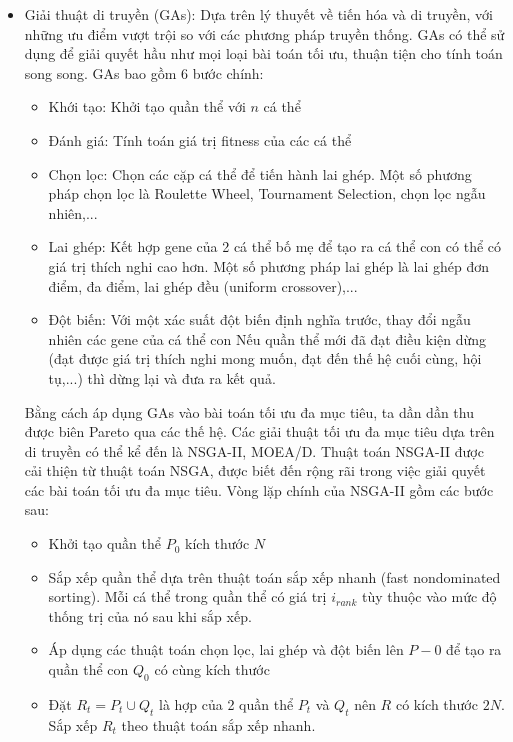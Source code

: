 \documentclass{article}
\begin{document}
\begin{itemize}
    \item Giải thuật di truyền (\gls{GAs}): Dựa trên lý thuyết về tiến hóa và di truyền, với những ưu điểm vượt trội so với các phương pháp truyền thống. GAs có thể sử dụng để giải quyết hầu như mọi loại bài toán tối ưu, thuận tiện cho tính toán song song.
    \newline GAs bao gồm 6 bước chính:
    \begin{itemize}
        \item Khới tạo: Khởi tạo quần thể với $n$ cá thể
        \item Đánh giá: Tính toán giá trị fitness của các cá thể
        \item Chọn lọc: Chọn các cặp cá thể để tiến hành lai ghép. Một số phương pháp chọn lọc là Roulette Wheel, Tournament Selection, chọn lọc ngẫu nhiên,...
        \item Lai ghép: Kết hợp gene của 2 cá thể bố mẹ để tạo ra cá thể con có thể có giá trị thích nghi cao hơn. Một số phương pháp lai ghép là lai ghép đơn điểm, đa điểm, lai ghép đều (uniform crossover),...
        \item Đột biến: Với một xác suất đột biến định nghĩa trước, thay đổi ngẫu nhiên các gene của cá thể con
        \newline Nếu quần thể mới đã đạt điều kiện dừng (đạt được giá trị thích nghi mong muốn, đạt đến thế hệ cuối cùng, hội tụ,...) thì dừng lại và đưa ra kết quả.  
    \end{itemize}
    Bằng cách áp dụng GAs vào bài toán tối ưu đa mục tiêu, ta dần dần thu được biên Pareto qua các thế hệ. Các giải thuật tối ưu đa mục tiêu dựa trên di truyền có thể kể đến là \gls{NSGA-II}, \gls{MOEA/D}. 
Thuật toán NSGA-II \cite{deb2002fast} được cải thiện từ thuật toán NSGA, được biết đến rộng rãi trong việc giải quyết các bài toán tối ưu  đa mục tiêu. Vòng lặp chính của NSGA-II gồm các bước sau:
\begin{itemize}
    \item Khởi tạo quần thể $P_0$ kích thước $N$
    \item Sắp xếp quần thể dựa trên thuật toán sắp xếp nhanh (fast nondominated sorting). Mỗi cá thể trong quần thể có  giá trị $i_{rank}$ tùy thuộc vào mức độ thống trị của nó sau khi sắp xếp.
    \item Áp dụng các thuật toán chọn lọc, lai ghép và đột biến lên $P-0$ để tạo ra quần thể con $Q_0$ có cùng kích thước
    \item Đặt $R_t = P_t \cup Q_t$ là hợp của 2 quần thể $P_t$ và $Q_t$ nên $R$ có kích thước $2N$. Sắp xếp $R_t$ theo thuật toán sắp xếp nhanh. 

\end{itemize}
\end{itemize}
\end{document}
